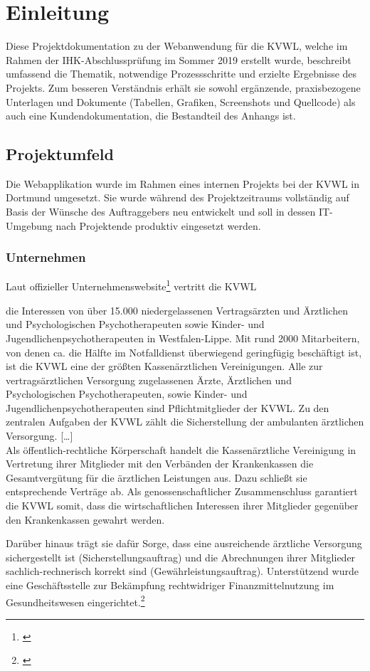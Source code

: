 \section{Einleitung}\label{sec:Einleitung}
Diese Projektdokumentation zu der Webanwendung \projektName für die \ac{KVWL}, welche im Rahmen der IHK-Abschlussprüfung im Sommer 2019 erstellt wurde, beschreibt umfassend die Thematik, notwendige Prozessschritte und erzielte Ergebnisse des Projekts. Zum besseren Verständnis erhält sie sowohl ergänzende, praxisbezogene Unterlagen und Dokumente (Tabellen, Grafiken, Screenshots und Quellcode) als auch eine Kundendokumentation, die Bestandteil des Anhangs ist.

\subsection{Projektumfeld}\label{sec:Projektumfeld}
Die Webapplikation wurde im Rahmen eines internen Projekts bei der \ac{KVWL} in Dortmund umgesetzt. Sie wurde während des Projektzeitraums vollständig auf Basis der Wünsche des Auftraggebers neu entwickelt und soll in dessen IT-Umgebung nach Projektende produktiv eingesetzt werden.

\subsubsection{Unternehmen}\label{sec:Unternehmen}
Laut offizieller Unternehmenswebsite\footnote{\cite{KVWL}} vertritt die \ac{KVWL}
\begin{displayquote}
	die Interessen von über 15.000 niedergelassenen Vertragsärzten und Ärztlichen und Psychologischen Psychotherapeuten sowie Kinder- und Jugendlichenpsychotherapeuten in Westfalen-Lippe. Mit rund 2000 Mitarbeitern, von denen ca. die Hälfte im Notfalldienst überwiegend geringfügig beschäftigt ist, ist die \ac{KVWL} eine der größten Kassenärztlichen Vereinigungen. Alle zur vertragsärztlichen Versorgung zugelassenen Ärzte, Ärztlichen und Psychologischen Psychotherapeuten, sowie Kinder- und Jugendlichenpsychotherapeuten sind Pflichtmitglieder der \ac{KVWL}. Zu den zentralen Aufgaben der \ac{KVWL} zählt die Sicherstellung der ambulanten ärztlichen Versorgung. [\ldots]\\
	Als öffentlich-rechtliche Körperschaft handelt die Kassenärztliche Vereinigung in Vertretung ihrer Mitglieder mit den Verbänden der Krankenkassen die Gesamtvergütung für die ärztlichen Leistungen aus. Dazu schließt sie entsprechende Verträge ab. Als genossenschaftlicher Zusammenschluss garantiert die \ac{KVWL} somit, dass die wirtschaftlichen Interessen ihrer Mitglieder gegenüber den Krankenkassen gewahrt werden.
\end{displayquote}
Darüber hinaus trägt sie dafür Sorge, dass eine ausreichende ärztliche Versorgung sichergestellt ist (Sicherstellungsauftrag) und die Abrechnungen ihrer Mitglieder sachlich-rechnerisch korrekt sind (Gewährleistungsauftrag). Unterstützend wurde eine Geschäftsstelle zur Bekämpfung rechtwidriger Finanzmittelnutzung im Gesundheitswesen eingerichtet.\footnote{\Vgl \cite{KVWL}}

